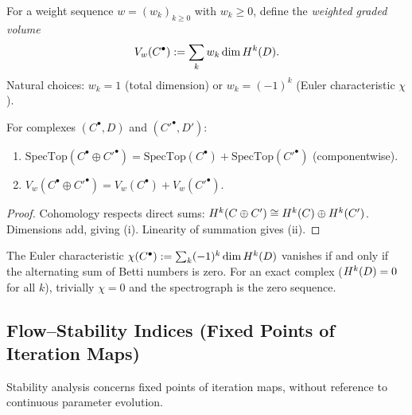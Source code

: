 \begin{definition}
\label{def:graded-volume}
For a weight sequence $w = (w_k)_{k \ge 0}$ with $w_k \ge 0$, define the \emph{weighted graded volume}
\[
V_w(C^\bullet) := \sum_k w_k \dim H^{k}(D).
\]
Natural choices: $w_k = 1$ (total dimension) or $w_k = (-1)^k$ (Euler characteristic $\chi$).
\end{definition}

\begin{lemma}
\label{lem:spectrograph-additivity}
For complexes $(C^\bullet, D)$ and $(C'^\bullet, D')$:
\begin{enumerate}[label=(\roman*)]
\item $\mathrm{SpecTop}(C^\bullet \oplus C'^\bullet) = \mathrm{SpecTop}(C^\bullet) + \mathrm{SpecTop}(C'^\bullet)$ (componentwise).
\item $V_w(C^\bullet \oplus C'^\bullet) = V_w(C^\bullet) + V_w(C'^\bullet)$.
\end{enumerate}
\end{lemma}

\begin{proof}
Cohomology respects direct sums: $H^{k}(C \oplus C') \cong H^{k}(C) \oplus H^{k}(C')$.
Dimensions add, giving (i). Linearity of summation gives (ii).
\end{proof}

\begin{remark}
The Euler characteristic $\chi(C^\bullet) := \sum_k (-1)^k \dim H^{k}(D)$ vanishes if and only if the alternating sum of Betti numbers is zero.
For an exact complex ($H^{k}(D) = 0$ for all $k$), trivially $\chi = 0$ and the spectrograph is the zero sequence.
\end{remark}

\subsection{Flow--Stability Indices (Fixed Points of Iteration Maps)}
\label{subsec:flow-stability}

Stability analysis concerns fixed points of iteration maps, without reference to continuous parameter evolution.

